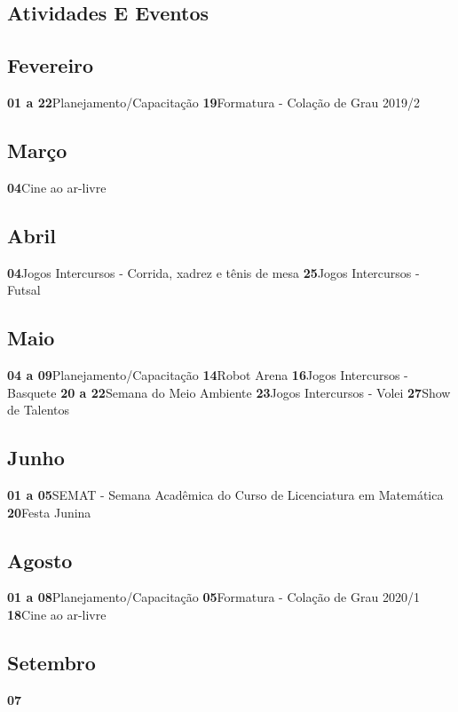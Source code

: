 \documentclass[thesis]{hmcposter}
\begin{document}
\begin{poster}
\normalsize \section{\color{hmcorange}Atividades E Eventos}\subsection{Fevereiro}\textbf{01 a 22}\quad \quad Planejamento/Capacitação \newline\textbf{19}\quad \quad \quad \quad Formatura - Colação de Grau 2019/2 \newline\subsection{Março}\textbf{04}\quad \quad \quad \quad Cine ao ar-livre \newline\subsection{Abril}\textbf{04}\quad \quad \quad \quad Jogos Intercursos - Corrida, xadrez e tênis de mesa \newline\textbf{25}\quad \quad \quad \quad Jogos Intercursos - Futsal \newline\subsection{Maio}\textbf{04 a 09}\quad \quad Planejamento/Capacitação \newline\textbf{14}\quad \quad \quad \quad Robot Arena \newline\textbf{16}\quad \quad \quad \quad Jogos Intercursos - Basquete \newline\textbf{20 a 22}\quad \quad Semana do Meio Ambiente \newline\textbf{23}\quad \quad \quad \quad Jogos Intercursos - Volei \newline\textbf{27}\quad \quad \quad \quad Show de Talentos \newline\subsection{Junho}\textbf{01 a 05}\quad \quad SEMAT - Semana Acadêmica do Curso de Licenciatura em Matemática \newline\textbf{20}\quad \quad \quad \quad Festa Junina \newline\subsection{Agosto}\textbf{01 a 08}\quad \quad Planejamento/Capacitação \newline\textbf{05}\quad \quad \quad \quad Formatura - Colação de Grau 2020/1 \newline\textbf{18}\quad \quad \quad \quad Cine ao ar-livre \newline\subsection{Setembro}\textbf{07}\quad \quad 
\end{poster}
\end{document}
